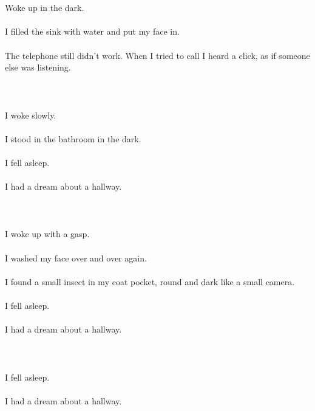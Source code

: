 \documentclass{article}
\begin{document}
    \section{}
    Woke up in the dark.\\\\I filled the sink with water and put my face in.\\\\The telephone still didn't work. When I tried to call I heard a click, as if someone else was listening.\\\\ 
    \newpage
    
    \section{}
    I woke slowly.\\\\I stood in the bathroom in the dark.\\\\I fell asleep.\\\\I had a dream about a hallway.\\\\ 
    \newpage
    
    \section{}
    I woke up with a gasp.\\\\I washed my face over and over again.\\\\I found a small insect in my coat pocket, round and dark like a small camera.\\\\I fell asleep.\\\\I had a dream about a hallway.\\\\ 
    \newpage
    
    \section{}
    I fell asleep.\\\\I had a dream about a hallway.\\\\ 
    \newpage
    
\end{document}
